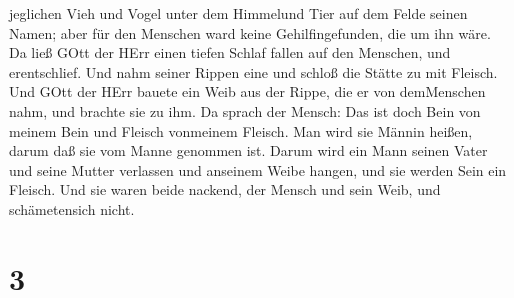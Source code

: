 jeglichen Vieh und Vogel unter dem Himmelund Tier auf dem Felde seinen
Namen; aber für den Menschen ward keine Gehilfingefunden, die um ihn
wäre.  Da ließ GOtt der HErr einen tiefen Schlaf fallen auf
den Menschen, und erentschlief. Und nahm seiner Rippen eine und schloß
die Stätte zu mit Fleisch.  Und GOtt der HErr bauete ein
Weib aus der Rippe, die er von demMenschen nahm, und brachte sie zu ihm.
 Da sprach der Mensch: Das ist doch Bein von meinem Bein
und Fleisch vonmeinem Fleisch. Man wird sie Männin heißen, darum daß sie
vom Manne genommen ist.  Darum wird ein Mann seinen Vater
und seine Mutter verlassen und anseinem Weibe hangen, und sie werden
Sein ein Fleisch.  Und sie waren beide nackend, der Mensch
und sein Weib, und schämetensich nicht.

\hypertarget{section-2}{%
\section{3}\label{section-2}}

